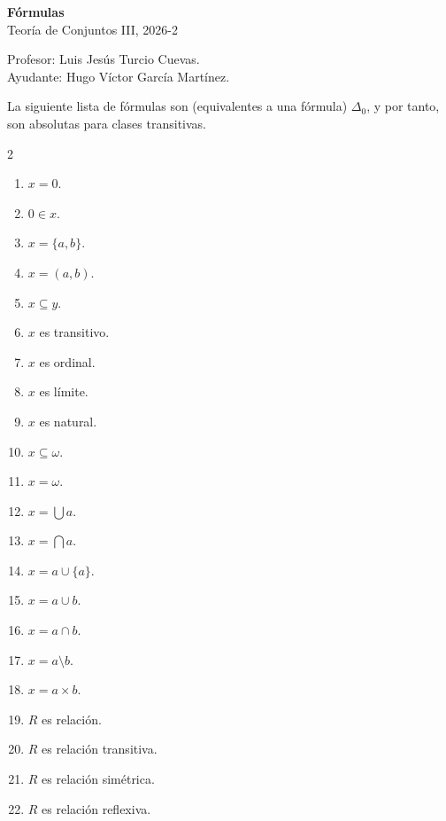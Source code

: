 \documentclass[letterpaper,DIV=15,12pt]{scrartcl}
\begin{document}
\thispagestyle{plain}

    \begin{center}
        {\fontsize{30}{60}\rmfamily \textbf{Fórmulas}} \\ \vspace{.2cm} Teoría de Conjuntos III, 2026-2
    \end{center}
    \begin{flushright}
        \footnotesize \hfill Profesor: Luis Jesús Turcio Cuevas.\\
        \hfill Ayudante: Hugo Víctor García Martínez.
    \end{flushright}
        
    La siguiente lista de fórmulas son (equivalentes a una fórmula) $\Delta_0$, y por tanto, son absolutas para clases transitivas.
    \begin{multicols}{2}
        \begin{enumerate}
            \item $x=0$.
            \item $0 \in x$.
            \item $x=\{a,b\}$.
            \item $x=(a,b)$.
            \item $x \subseteq y$.
            \item $x$ es transitivo.
            \item $x$ es ordinal.
            \item $x$ es límite.
            \item $x$ es natural.
            \item $x \subseteq \omega$.
            \item $x = \omega$.
            \item $x = \bigcup a$.
            \item $x = \bigcap a$.
            \item $x = a \cup \{a\}$.
            \item $x = a \cup b$.
            \item $x = a \cap b$.
            \item $x = a \setminus b$.
            \item $x = a \times b$.
            \item $R$ es relación.
            \item $R$ es relación transitiva.
            \item $R$ es relación simétrica.
            \item $R$ es relación reflexiva.

\end{enumerate}
\end{multicols}
\end{document}
